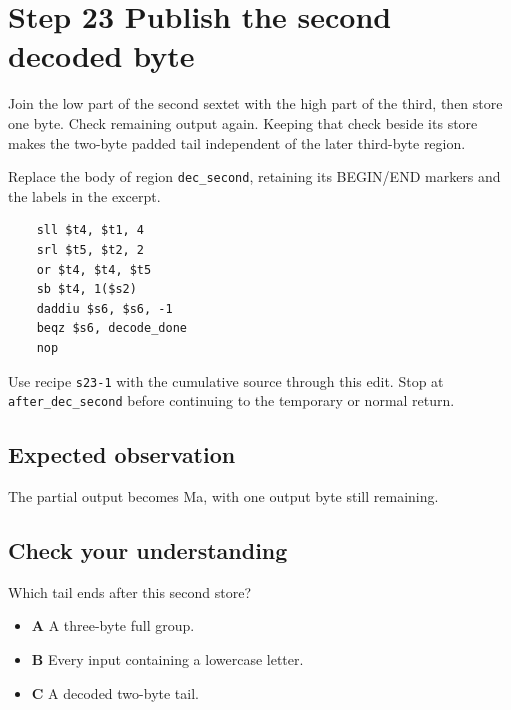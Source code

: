 \section{Step 23 Publish the second decoded byte}\label{base64-s23}

Join the low part of the second sextet with the high part of the third, then store one byte. Check remaining output again. Keeping that check beside its store makes the two-byte padded tail independent of the later third-byte region.

Replace the body of region \texttt{dec\_second}, retaining its BEGIN/END markers and the labels in the excerpt.

\begin{verbatim}
    sll $t4, $t1, 4
    srl $t5, $t2, 2
    or $t4, $t4, $t5
    sb $t4, 1($s2)
    daddiu $s6, $s6, -1
    beqz $s6, decode_done
    nop
\end{verbatim}

Use recipe \texttt{s23-1} with the cumulative source through this edit. Stop at \texttt{after\_dec\_second} before continuing to the temporary or normal return.

\subsection{Expected observation}
The partial output becomes Ma, with one output byte still remaining.

\subsection{Check your understanding}
Which tail ends after this second store?

\begin{itemize}
  \item \textbf{A} A three-byte full group.
  \item \textbf{B} Every input containing a lowercase letter.
  \item \textbf{C} A decoded two-byte tail.
\end{itemize}
